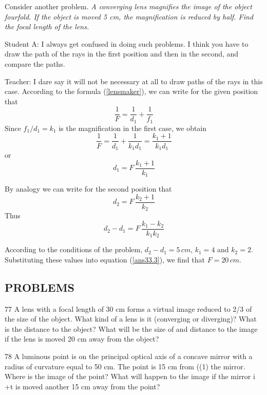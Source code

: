 \documentclass[a4paper,12pt]{book}
\begin{document}
{Consider another problem. \emph{A converging lens magnifies the image of the object fourfold. If the object is moved 5 cm, the magnification is reduced by half. Find the focal length of the lens.}

{\sc Student A:} I always get confused in doing such problems. I think you have to draw the path of the rays in the first position and then in the second, and compare the paths.

{\sc Teacher:} I dare say it will not be necessary at all to draw paths of the rays in this case. According to the formula (\ref{lensmaker}), we can write for the given position that 
\begin{equation*}
\frac{1}{F} = \frac{1}{d_{1}} + \frac{1}{f_{1}}
\end{equation*}
 Since $f_{1}/d_{1} = k_{1}$ is the magnification in the first case, we obtain
\begin{equation*}
\frac{1}{F} = \frac{1}{d_{1}} + \frac{1}{k_{1}d_{1}} = \frac{k_{1}+1}{k_{1}d_{1}}
\end{equation*}
 or 
\begin{equation*}
d_{1} = F \, \frac{k_{1}+1}{k_{1}}
\end{equation*}

By analogy we can write for the second position that
\begin{equation*}
d_{2} = F \, \frac{k_{2}+1}{k_{2}}
\end{equation*}
Thus 
\begin{equation}
d_{2} - d_{1} = F \, \frac{k_{1}-k_{2}}{k_{1}k_{2}} \label{ans33.3}
\end{equation}

According to the conditions of the problem, $d_{2} - d_{1} = 5 \,cm$, $k_{1}=4$ and $k_{2} = 2$. Substituting these values into equation (\ref{ans33.3}), we find that $F = 20 \, cm$.

\subsection*{PROBLEMS}
\begin{description}
\item{77} A lens with a focal length of 30 cm forms a virtual image reduced
to 2/3 of the size of the object. What kind of a lens is it (converging or
diverging)? What is the distance to the object? What will be the size of
and distance to the image if the lens is moved 20 cm away from the object?


\item{78} A luminous point is on the principal optical axis of a concave
mirror with a radius of curvature equal to 50 cm. The point is 15 cm from ((1) the mirror. Where is the image of the point? What will happen to the image if the mirror i +t is moved another 15 cm away from the point?


\end{description}}
\end{document}
